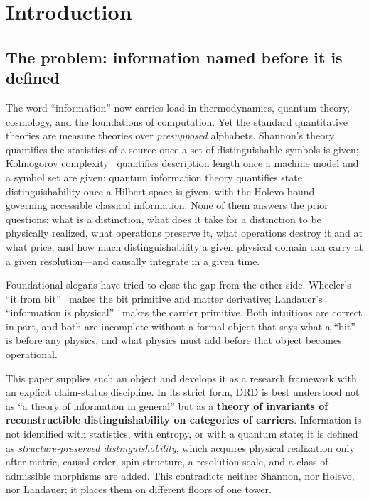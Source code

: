 \documentclass[11pt,a4paper]{article}
\theoremstyle{definition}
\theoremstyle{remark}
\begin{document}
\tableofcontents

\section{Introduction}

\subsection{The problem: information named before it is defined}

The word ``information'' now carries load in thermodynamics, quantum theory, cosmology, and the
foundations of computation.  Yet the standard quantitative theories are measure theories over
\emph{presupposed} alphabets.  Shannon's theory~\cite{Shannon1948} quantifies the statistics of
a source once a set of distinguishable symbols is given; Kolmogorov
complexity~\cite{Kolmogorov1965} quantifies description length once a machine model and a
symbol set are given; quantum information theory quantifies state distinguishability once a
Hilbert space is given, with the Holevo bound~\cite{Holevo1973} governing accessible classical
information.  None of them answers the prior questions: what is a distinction, what does it
take for a distinction to be physically realized, what operations preserve it, what operations
destroy it and at what price, and how much distinguishability a given physical domain can carry
at a given resolution---and causally integrate in a given time.

Foundational slogans have tried to close the gap from the other side.  Wheeler's ``it from
bit''~\cite{Wheeler1990} makes the bit primitive and matter derivative; Landauer's
``information is physical''~\cite{Landauer1991} makes the carrier primitive.  Both intuitions
are correct in part, and both are incomplete without a formal object that says what a ``bit''
is before any physics, and what physics must add before that object becomes operational.

This paper supplies such an object and develops it as a research framework with an explicit
claim-status discipline.  In its strict form, DRD is best understood not as ``a theory of
information in general'' but as a \textbf{theory of invariants of reconstructible
distinguishability on categories of carriers}.  Information is not identified with statistics,
with entropy, or with a quantum state; it is defined as \emph{structure-preserved
distinguishability}, which acquires physical realization only after metric, causal order, spin
structure, a resolution scale, and a class of admissible morphisms are added.  This contradicts
neither Shannon, nor Holevo, nor Landauer; it places them on different floors of one tower.
\end{document}
